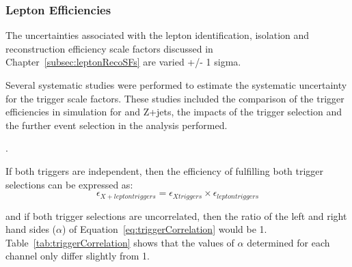 
\subsubsection{Lepton Efficiencies}
The uncertainties associated with the lepton identification, isolation and reconstruction efficiency scale factors discussed in Chapter~\ref{subsec:leptonRecoSFs} are varied +/- 1 sigma.

Several systematic studies were performed to estimate the systematic uncertainty for the trigger scale factors.
These studies included the comparison of the trigger efficiencies in simulation for \ttbar and Z+jets, the impacts of the \MET trigger selection and the further event selection in the analysis performed. 

.


If both triggers are independent, then the efficiency of fulfilling both trigger selections can be expressed as:
\begin{equation}
\epsilon_{X + lepton triggers} = \epsilon_{X triggers} \times \epsilon_{lepton triggers}
\label{eq:triggerCorrelation}
\end{equation}

and if both trigger selections are uncorrelated, then the ratio of the left and right hand sides ($\alpha$) of Equation~\ref{eq:triggerCorrelation} would be 1.
Table~\ref{tab:triggerCorrelation} shows that the values of $\alpha$ determined for each channel only differ slightly from 1.


\begin{table}[htbp]
\label{tab:triggerCorrelation}
  \centering
\end{table}

